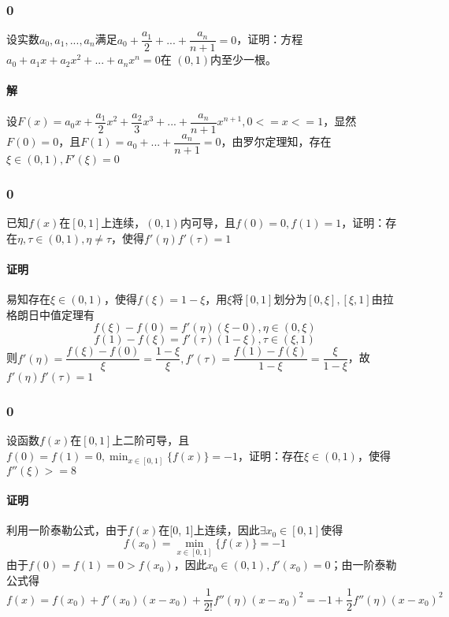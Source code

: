 \subsubsection{0}
设实数\(a_0, a_1, ..., a_n\)满足\(a_0 + \dfrac{a_1}{2} + ... + \dfrac{a_n}{n + 1} = 0\)，证明：方程\(a_0 + a_1x + a_2x^2 + ... + a_nx^n = 0\)在 \((0, 1)\)内至少一根。

\paragraph{解}
设\(F(x) = a_0x + \dfrac{a_1}{2}x^2 + \dfrac{a_2}{3}x^3 + ... + \dfrac{a_n}{n + 1}x^{n + 1}, 0 <= x <= 1\)，显然\(F(0) = 0\)，且\(F(1) = a_0 + ... + \dfrac{a_n}{n + 1} = 0\)，由罗尔定理知，存在\(\xi \in (0, 1), F'(\xi) = 0\)


\subsubsection{0}
已知\(f(x)\)在\([0, 1]\)上连续，\((0, 1)\)内可导，且\(f(0) = 0, f(1) = 1\)，证明：存在\(\eta, \tau \in (0, 1), \eta \neq \tau\)，使得\(f'(\eta)f'(\tau) = 1\)

\paragraph{证明}
易知存在\(\xi \in (0, 1)\)，使得\(f(\xi) = 1 - \xi\)，用\(\xi\)将\([0, 1]\)划分为\([0, \xi], [\xi, 1]\)由拉格朗日中值定理有\[f(\xi) - f(0) = f'(\eta)(\xi - 0), \eta \in (0, \xi)\]
\[f(1) - f(\xi) = f'(\tau)(1 - \xi), \tau \in (\xi, 1)\]
则\(f'(\eta) = \dfrac{f(\xi) - f(0)}{\xi} = \dfrac{1 - \xi}{\xi}, f'(\tau) = \dfrac{f(1) - f(\xi)}{1 - \xi} = \dfrac{\xi}{1 - \xi}\)，故\(f'(\eta)f'(\tau) = 1\)


\subsubsection{0}
设函数\(f(x)\)在\([0, 1]\)上二阶可导，且\(f(0) = f(1) = 0, \displaystyle \min_{x \in [0, 1]}\{f(x)\} = -1\)，证明：存在\(\xi \in (0, 1)\)，使得\(f''(\xi) >= 8\)

\paragraph{证明}
利用一阶泰勒公式，由于\(f(x)\)在[0, 1]上连续，因此\(\exists x_0 \in [0, 1]\)使得\[f(x_0) = \displaystyle\min_{x \in [0, 1]}\{f(x)\} = -1\]
由于\(f(0) = f(1) = 0 > f(x_0)\)，因此\(x_0 \in (0, 1), f'(x_0) = 0\)；由一阶泰勒公式得\[f(x) = f(x_0) + f'(x_0)(x - x_0) + \dfrac{1}{2!}f''(\eta)(x - x_0)^2 = -1 + \dfrac{1}{2}f''(\eta)(x - x_0)^2\]

